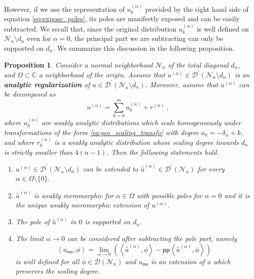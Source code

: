 \documentclass[11pt]{book}
\newcommand{\pp}{\mathsf{pp}}
\newcommand{\ms}{\mathsf{ms}}
\newcommand{\sm}[1]{\left\langle#1\right\rangle}
\newcommand{\exte}[1]{\overset{\circ}{#1}}
\newcommand{\Dcal}{\mathcal{D}}
\newcommand{\Ncal}{\mathcal{N}}
\newcommand{\Cbb}{\mathbb{C}}
\theoremstyle{break}
\newtheorem{proposition}{Proposition}[chapter]
\begin{document}
However, if we use the representation of $u^{(\alpha)}_k$ provided by the right hand side of equation \eqref{eq:expose_poles}, its poles are manifestly exposed and can be easily subtracted. We recall that, since the original distribution $u^{(\alpha)}_k$ is well defined on $\Ncal_n\setminus d_n$ even for $\alpha=0$, the principal part we are subtracting can only be supported on $d_n$. We summarize this discussion in the following proposition.


\begin{proposition}\label{prop:regularization}
Consider a normal neighborhood $\Ncal_n$ of the total diagonal $d_n$, and $\Omega \subset \Cbb$ a neighborhood of the origin. Assume that $u^{(\alpha)}\in\Dcal^\prime(\Ncal_n\setminus d_n)$ is an \textbf{analytic regularization} of $u\in\Dcal^\prime(\Ncal_n\setminus d_n)$. Moreover, assume that $u^{(\alpha)}$ can be decomposed as 
%
\begin{equation*}
u^{(\alpha)} = \sum_{k=0}^m u^{(\alpha)}_k + r^{(\alpha)} \ ,
\end{equation*}
%
where $u^{(\alpha)}_k$ are weakly analytic distributions which scale homogeneously under transformations of the form \eqref{eq:geo_scaling_transfo} with degree $a_k = -\delta_\alpha + k$, and where $r^{(\alpha)}_k$ is a weakly analytic distribution whose scaling degree towards $d_n$ is strictly smaller than $4(n-1)$. Then the following statements hold.
%
\begin{enumerate}
\item\label{item:1_regularization} $u^{(\alpha)} \in \Dcal^\prime(\Ncal_n\setminus d_n)$ can be extended to $\exte{u}^{(\alpha)} \in \Dcal^\prime(\Ncal_n)$ for every $\alpha \in \Omega \setminus \{0\}$.
%
\item\label{item:2_regularization} $\exte{u}^{(\alpha)}$ is weakly meromorphic for $\alpha \in \Omega$ with possible poles for $\alpha=0$ and it is the unique weakly meromorphic extension of $u^{(\alpha)}$.
%
\item\label{item:3_regularization} The pole of $\exte{u}^{(\alpha)}$ in $0$ is supported on $d_n$.
%
\item\label{item:4_regularization} The limit $\alpha \to 0$ can be considered after subtracting the pole part, namely
%
\begin{equation*}
\sm{ u_\ms, \phi } = \lim_{\alpha \to 0} \left( \sm{ \exte{u}^{(\alpha)} , \phi } - \pp\sm{ \exte{u}^{(\alpha)} , \phi } \right) 
\end{equation*}
%
is well defined for all $\phi \in \Dcal(\Ncal_n)$ and $u_\ms$ is an extension of $u$ which preserves the scaling degree.
\end{enumerate}
%
\end{proposition}
\end{document}
